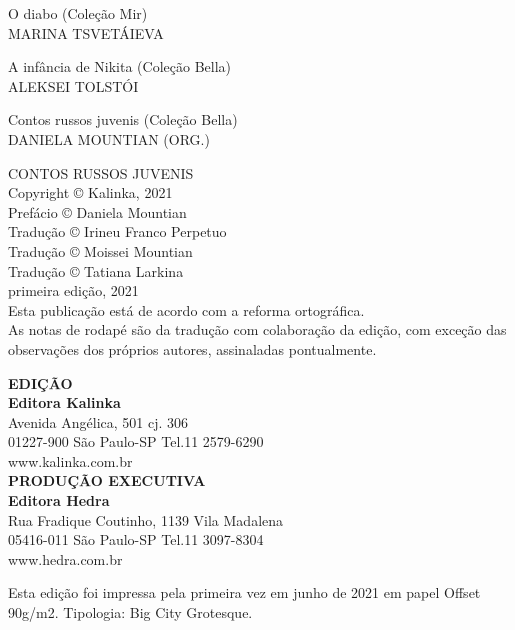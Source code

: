 {\noindent{}O diabo (Coleção Mir)\\
MARINA TSVETÁIEVA
\medskip

\noindent{}A infância de Nikita (Coleção Bella)\\
ALEKSEI TOLSTÓI
\medskip

\noindent{}Contos russos juvenis (Coleção Bella)\\
DANIELA MOUNTIAN (ORG.)

\pagebreak
\thispagestyle{empty}
\movetooddpage
\thispagestyle{empty}

\begingroup\footnotesize

\vspace*{\fill}
\begin{flushright}
CONTOS RUSSOS JUVENIS\\[6pt]
Copyright © Kalinka, 2021\\[6pt]
Prefácio © Daniela Mountian\\[6pt]
Tradução © Irineu Franco Perpetuo\\[6pt]
Tradução © Moissei Mountian\\[6pt]
Tradução © Tatiana Larkina\\[20pt]

primeira edição, 2021\\[20pt]

Esta publicação está de acordo com a reforma ortográfica.\\[6pt]

As notas de rodapé são da tradução com colaboração da edição, com exceção das observações dos próprios autores, assinaladas pontualmente.\\[6pt]
\end{flushright}
\vspace*{\fill}

\vfill


\begin{flushright}
\textbf{EDIÇÃO}\\
\textbf{Editora Kalinka}\\
Avenida Angélica, 501 cj. 306\\
01227-900 São Paulo-SP Tel.11 2579-6290\\
www.kalinka.com.br\\[10pt]

\textbf{PRODUÇÃO EXECUTIVA}\\
\textbf{Editora Hedra}\\
Rua Fradique Coutinho, 1139 Vila Madalena\\
05416-011 São Paulo-SP Tel.11 3097-8304\\
www.hedra.com.br
\end{flushright}

\endgroup

\pagebreak
\mbox{}\vfill\small\thispagestyle{empty}
\begin{center} \label{LastPage}
		\begin{minipage}{.7\textwidth}
		\centering\tiny\noindent{}Esta edição foi impressa pela primeira vez em junho de 2021 em papel Offset 90g/m2. Tipologia: Big City Grotesque. \begin{center}\normalsize{}\end{center}
		\end{minipage}
\end{center}

